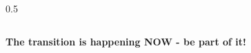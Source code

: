 \documentclass[aspectratio=169,10pt]{beamer}
\newcommand{\teaching}[1]{}
\theoremstyle{plain}
\begin{document}
\begin{frame}
\begin{columns}[T]
\begin{column}{0.5\textwidth}
    \end{column}
  \end{columns}
  
  \vspace{0.3cm}
  
  \begin{greenBox}
    \textbf{The transition is happening NOW - be part of it!}
  \end{greenBox}
  
  \teaching{Show real-world momentum}
\end{frame}

\end{document}
